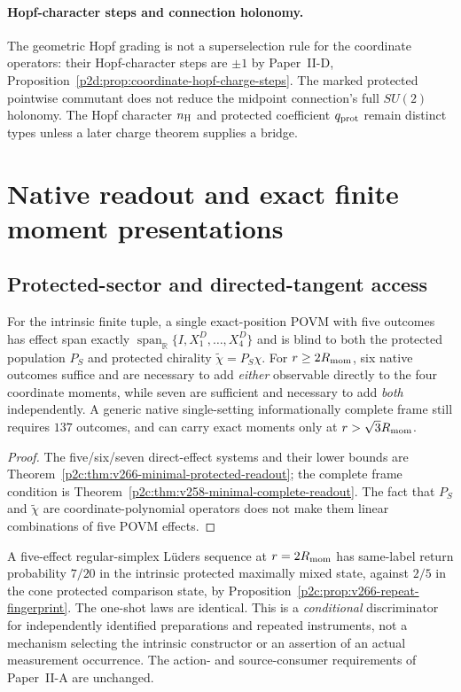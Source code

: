 \documentclass[12pt,a4paper]{article}
\begin{document}
\paragraph{Hopf-character steps and connection holonomy.}
The geometric Hopf grading is not a superselection rule for the
coordinate operators: their Hopf-character steps are $\pm1$ by
Paper~II-D, Proposition~\ref{p2d:prop:coordinate-hopf-charge-steps}.
The marked protected pointwise commutant does not reduce the
midpoint connection's full $SU(2)$ holonomy.  The Hopf character
$n_{\rm H}$ and protected coefficient $q_{\rm prot}$ remain distinct
types unless a later charge theorem supplies a bridge.

\section{Native readout and exact finite moment presentations}
\subsection{Protected-sector and directed-tangent access}

\label{p2e:sec:v266-protected-readout}
\begin{corollary}
\label{p2e:cor:v266-minimal-protected-readout}
For the intrinsic finite tuple, a single exact-position POVM with five
outcomes has effect span exactly
$\operatorname{span}_{\mathbb R}\{I,X_1^D,\ldots,X_4^D\}$ and is blind to
both the protected population $P_S$ and protected chirality
$\widetilde\chi=P_S\chi$. For $r\ge2R_{\mathrm{mom}}$, six native outcomes suffice
and are necessary to add \emph{either} observable directly to the four
coordinate moments, while seven are sufficient and necessary to add
\emph{both} independently. A generic native single-setting
informationally complete frame still requires $137$ outcomes, and can
carry exact moments only at $r>\sqrt3R_{\mathrm{mom}}$.
\end{corollary}
\begin{proof}
The five/six/seven direct-effect systems and their lower bounds are
Theorem~\ref{p2c:thm:v266-minimal-protected-readout}; the complete
frame condition is
Theorem~\ref{p2c:thm:v258-minimal-complete-readout}.
The fact that $P_S$ and $\widetilde\chi$ are coordinate-polynomial
operators does not make them linear combinations of five POVM effects.
\end{proof}
\begin{remark}
\label{p2e:rem:v266-fingerprint}
A five-effect regular-simplex L\"uders sequence at $r=2R_{\mathrm{mom}}$ has
same-label return probability $7/20$ in the intrinsic protected
maximally mixed state, against $2/5$ in the cone protected comparison
state, by Proposition~\ref{p2c:prop:v266-repeat-fingerprint}.
The one-shot laws are identical. This is a \emph{conditional} discriminator
for independently identified preparations and repeated instruments,
not a mechanism selecting the intrinsic constructor or an assertion of
an actual measurement occurrence. The action- and source-consumer
requirements of Paper~II-A are unchanged.
\end{remark}
\end{document}
